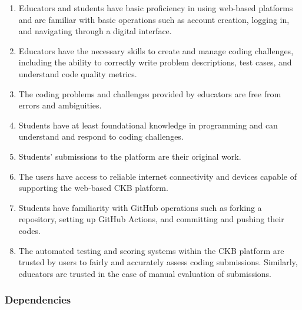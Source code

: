 \begin{enumerate}
    \item Educators and students have basic proficiency in using web-based platforms and are familiar with basic operations such as account creation, logging in, and navigating through a digital interface.

    \item Educators have the necessary skills to create and manage coding challenges, including the ability to correctly write problem descriptions, test cases, and understand code quality metrics.

    \item The coding problems and challenges provided by educators are free from errors and ambiguities.

    \item Students have at least foundational knowledge in programming and can understand and respond to coding challenges.

    \item Students' submissions to the platform are their original work.

    \item The users have access to reliable internet connectivity and devices capable of supporting the web-based CKB platform.

    \item Students have familiarity with GitHub operations such as forking a repository, setting up GitHub Actions, and committing and pushing their codes.

    \item The automated testing and scoring systems within the CKB platform are trusted by users to fairly and accurately assess coding submissions. Similarly, educators are trusted in the case of manual evaluation of submissions.

\end{enumerate}

\subsubsection{Dependencies}

